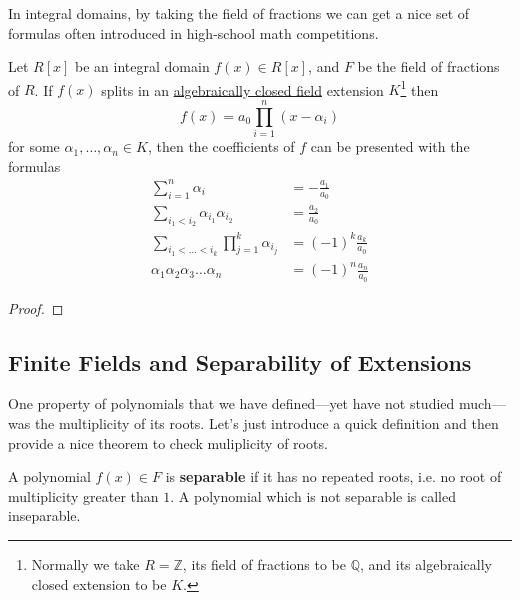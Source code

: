   In integral domains, by taking the field of fractions we can get a nice set of formulas often introduced in high-school math competitions. 

  \begin{theorem}
    \label{thm:vietes-formulas}
    Let $R[x]$ be an integral domain $f(x) \in R[x]$, and $F$ be the field of fractions of $R$. If $f(x)$ splits in an \hyperref[def:algebraically-closed-field]{algebraically closed field} extension $K$\footnote{Normally we take $R = \mathbb{Z}$, its field of fractions to be $\mathbb{Q}$, and its algebraically closed extension to be $K$.} then
    \begin{equation}
      f(x) = a_0 \prod_{i = 1}^{n} (x - \alpha_i)
    \end{equation}
    for some $\alpha_1, \ldots, \alpha_n \in K$, then the coefficients of $f$ can be presented with the formulas
    \begin{align}
      \sum_{i=1}^n \alpha_i & = - \frac{a_1}{a_0} \\
      \sum_{i_1 < i_2} \alpha_{i_1} \alpha_{i_2} & = \frac{a_2}{a_0} \\
      \sum_{i_1< ...< i_k} \prod_{j = 1}^{k} \alpha_{i_j} & = (-1)^k \frac{a_k}{a_0} \\
      \alpha_1 \alpha_2 \alpha_3 ... \alpha_n & = (-1)^n \frac{a_n}{a_0}
    \end{align}
  \end{theorem}
  \begin{proof}
    
  \end{proof}

\subsection{Finite Fields and Separability of Extensions} 

  One property of polynomials that we have defined---yet have not studied much---was the multiplicity of its roots. Let's just introduce a quick definition and then provide a nice theorem to check muliplicity of roots.  

  \begin{definition}
    \label{def:separability-of-polynoials}
    A polynomial $f(x) \in F$ is \textbf{separable} if it has no repeated roots, i.e. no root of multiplicity greater than $1$. A polynomial which is not separable is called inseparable. 
  \end{definition}

